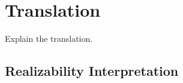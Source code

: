 
\section{Translation}
\label{sec:translation}

Explain the translation.

\subsection{Realizability Interpretation}
\label{sec:realizability-interpretation}



